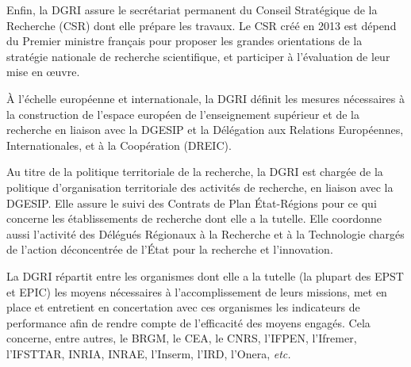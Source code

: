 Enfin, la DGRI assure le secr\'etariat permanent du Conseil Strat\'egique de la Recherche (CSR) dont elle pr\'epare les travaux.
Le CSR cr\'e\'e en 2013 est dépend du Premier ministre fran\c cais pour proposer les grandes orientations de la strat\'egie nationale de recherche scientifique, et participer \`a l'\'evaluation de leur mise en \oe uvre.

\`A l'\'echelle europ\'eenne et internationale, la DGRI d\'efinit les mesures n\'ecessaires \`a la construction de l'espace europ\'een de l'enseignement sup\'erieur et de la recherche en liaison avec la DGESIP et la D\'el\'egation aux Relations Europ\'eennes, Internationales, et \`a la Coop\'eration (DREIC).

Au titre de la politique territoriale de la recherche, la DGRI est charg\'ee de la politique d'organisation territoriale des activit\'es de recherche, en liaison avec la DGESIP. Elle assure le suivi des Contrats de Plan \'Etat-R\'egions pour ce qui concerne les \'etablissements de recherche dont elle a la tutelle.
Elle coordonne aussi l'activit\'e des D\'el\'egu\'es R\'egionaux \`a la Recherche et \`a la Technologie charg\'es de l'action d\'econcentr\'ee de l'\'Etat pour la recherche et l'innovation.

La DGRI r\'epartit entre les organismes dont elle a la tutelle (la
plupart des EPST et EPIC) les moyens n\'ecessaires \`a
l'accomplissement de leurs missions, met en place et entretient en
concertation avec ces organismes les indicateurs de performance afin
de rendre compte de l'efficacit\'e des moyens engag\'es. Cela
concerne, entre autres, le BRGM, le CEA, le CNRS,
l'IFPEN, l'Ifremer, l'IFSTTAR, INRIA, INRAE, l'Inserm, l'IRD, l'Onera, {\em etc.}

